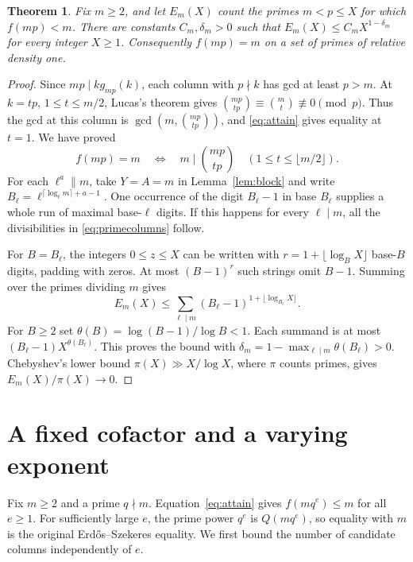 \documentclass[a4paper,11pt]{article}
\newtheorem{theorem}{Theorem}[section]
\newcommand{\colg}[2]{g_{#1}(#2)}
\begin{document}
\begin{theorem}\label{thm:prime}
Fix \(m\ge2\), and let \(E_m(X)\) count the primes \(m<p\le X\) for
which \(f(mp)<m\). There are constants \(C_m,\delta_m>0\) such that
\(E_m(X)\le C_m X^{1-\delta_m}\) for every integer \(X\ge1\).
Consequently \(f(mp)=m\) on a set of primes of relative density one.
\end{theorem}

\begin{proof}
Since \(mp\mid k\colg{mp}{k}\), each column with \(p\nmid k\) has gcd
at least \(p>m\). At \(k=tp\), \(1\le t\le m/2\), Lucas's theorem gives
\(\binom{mp}{tp}\equiv\binom mt\not\equiv0\pmod p\). Thus the gcd at
this column is \(\gcd(m,\binom{mp}{tp})\), and \eqref{eq:attain} gives
equality at \(t=1\). We have proved
\begin{equation}\label{eq:primecolumns}
 f(mp)=m\quad\Longleftrightarrow\quad
 m\mid\binom{mp}{tp}\quad(1\le t\le\lfloor m/2\rfloor).
\end{equation}
For each \(\ell^a\parallel m\), take \(Y=A=m\) in Lemma~\ref{lem:block}
and write \(B_\ell=\ell^{\lceil\log_\ell m\rceil+a-1}\).
One occurrence of the digit \(B_\ell-1\) in base \(B_\ell\) supplies a
whole run of maximal base-\(\ell\) digits. If this happens for every
\(\ell\mid m\), all the divisibilities in \eqref{eq:primecolumns} follow.

For \(B=B_\ell\), the integers \(0\le z\le X\) can be written with
\(r=1+\lfloor\log_B X\rfloor\) base-\(B\) digits, padding with zeros.
At most \((B-1)^r\) such strings omit \(B-1\). Summing over the primes
dividing \(m\) gives
\[
 E_m(X)\le\sum_{\ell\mid m}(B_\ell-1)^{1+\lfloor\log_{B_\ell}X\rfloor}.
\]
For \(B\ge2\) set \(\theta(B)=\log(B-1)/\log B<1\). Each summand
is at most \((B_\ell-1)X^{\theta(B_\ell)}\). This proves the bound
with \(\delta_m=1-\max_{\ell\mid m}\theta(B_\ell)>0\).
Chebyshev's lower bound \(\pi(X)\gg X/\log X\), where \(\pi\) counts
primes, gives \(E_m(X)/\pi(X)\to0\).
\end{proof}

\section{A fixed cofactor and a varying exponent}\label{sec:powers}

Fix \(m\ge2\) and a prime \(q\nmid m\). Equation~\eqref{eq:attain}
gives \(f(mq^e)\le m\) for all \(e\ge1\). For sufficiently large
\(e\), the prime power \(q^e\) is \(Q(mq^e)\), so equality with \(m\)
is the original Erd\H{o}s--Szekeres equality. We first bound the number
of candidate columns independently of \(e\).
\end{document}
